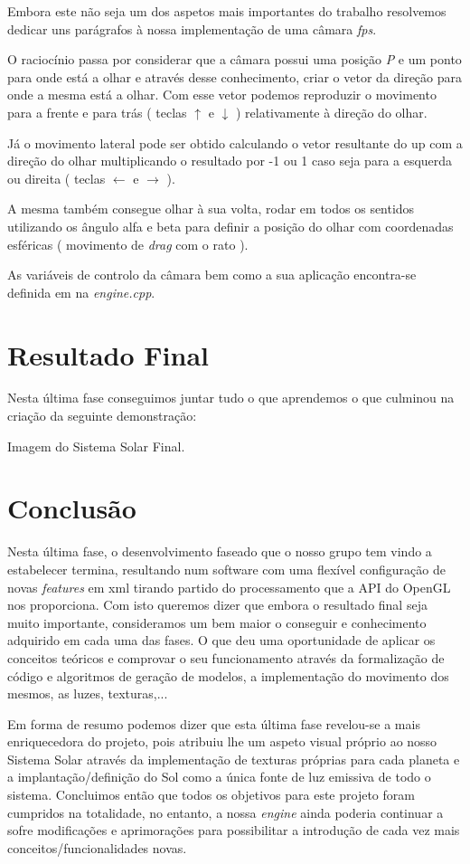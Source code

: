 \documentclass[11pt,a4paper]{report}
\begin{document}
Embora este não seja um dos aspetos mais importantes do trabalho resolvemos dedicar uns parágrafos à nossa implementação de uma câmara \emph{fps}.

O raciocínio passa por considerar que a câmara possui uma posição \emph{P} e um ponto para onde está a olhar e através desse conhecimento, criar o vetor da direção para onde a mesma está a olhar. Com esse vetor podemos reproduzir o movimento para a frente e para trás ( teclas $\uparrow$ e $\downarrow$ ) relativamente à direção do olhar.

Já o movimento lateral pode ser obtido calculando o vetor resultante do up com a direção do olhar multiplicando o resultado por -1 ou 1 caso seja para a esquerda ou direita ( teclas $\leftarrow$ e $\rightarrow$ ).

A mesma também consegue olhar à sua volta, rodar em todos os sentidos utilizando os ângulo alfa e beta para definir a posição do olhar com coordenadas esféricas ( movimento de \emph{drag} com o rato ).

As variáveis de controlo da câmara bem como a sua aplicação encontra-se definida em na \emph{engine.cpp}.

\chapter{Resultado Final}

Nesta última fase conseguimos juntar tudo o que aprendemos o que culminou na criação da seguinte demonstração:

Imagem do Sistema Solar Final.

\chapter{Conclusão}

Nesta última fase, o desenvolvimento faseado que o nosso grupo tem vindo a estabelecer termina, resultando num software com uma flexível configuração de novas \emph{features} em xml tirando partido do processamento que a API do OpenGL nos proporciona. Com isto queremos dizer que embora o resultado final seja muito importante, consideramos um bem maior o conseguir e conhecimento adquirido em cada uma das fases. O que deu uma oportunidade de aplicar os conceitos teóricos e comprovar o seu funcionamento através da formalização de código e algoritmos de geração de modelos, a implementação do movimento dos mesmos, as luzes, texturas,...

Em forma de resumo podemos dizer que esta última fase revelou-se a mais enriquecedora do projeto, pois atribuiu lhe um aspeto visual próprio ao nosso Sistema Solar através da implementação de texturas próprias para cada planeta e a implantação/definição do Sol como a única fonte de luz emissiva de todo o sistema. Concluimos então que todos os objetivos para este projeto foram cumpridos na totalidade, no entanto, a nossa \emph{engine} ainda poderia continuar a sofre modificações e aprimorações para possibilitar a introdução de cada vez mais conceitos/funcionalidades novas.
\end{document}
